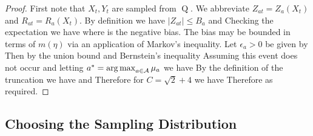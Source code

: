 \begin{proof}
First note that $X_t, Y_t$ are sampled from $\operatorname{Q}$.
We abbreviate $Z_{at} = Z_a(X_t)$ and $R_{at} = R_a(X_t)$.
By definition we have $|Z_{at}| \leq B_a$ and 
Checking the expectation we have
where 
is the negative bias. 
The bias may be bounded in terms of $m(\eta)$ via an application of Markov's inequality.
Let $\epsilon_a > 0$ be given by
Then by the union bound and Bernstein's inequality 
Assuming this event does not occur and letting $a^* = \argmax_{a \in \calA} \mu_a$ we have
By the definition of the truncation
we have
and
Therefore for $C = \sqrt{2} + 4$ we have
Therefore
as required.
\end{proof}

\subsection*{Choosing the Sampling Distribution}

